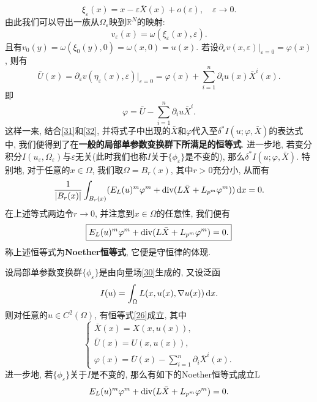 \begin{equation*}
    \xi_{\varepsilon}(x) = x - \varepsilon\bar{X}(x) + o(\varepsilon), \quad \varepsilon \rightarrow 0.
\end{equation*} 
由此我们可以导出一族从$\Omega_{\varepsilon}$映到$\mathbb{R}^N$的映射:
\begin{equation*}
    v_{\varepsilon}(x) = \omega(\xi_{\varepsilon}(x), \varepsilon). 
\end{equation*}
且有$v_0(y) = \omega(\xi_0(y), 0) = \omega(x, 0) = u(x)$. 若设$\partial_{\varepsilon}v(x, \varepsilon)|_{\varepsilon = 0} = \varphi(x)$, 则有  
\begin{equation*}
    \bar{U}(x) = \partial_{\varepsilon}v(\eta_{\varepsilon}(x), \varepsilon)|_{\varepsilon = 0} = \varphi(x) + \sum_{i = 1}^n\partial_iu(x)\bar{X}^i(x).
\end{equation*}
即 
\begin{equation}\label{32}
    \varphi = \bar{U} - \sum_{i = 1}^n\partial_iu\bar{X}^i. 
\end{equation}
这样一来, 结合\eqref{31}和\eqref{32}, 并将式子中出现的$\bar{X}$和$\varphi$代入至$\delta^*I(u; \varphi, \bar{X})$的表达式中, 我们便得到了在\textbf{一般的局部单参数变换群下所满足的恒等式}.
进一步地, 若变分积分$I(u_{\varepsilon}, \Omega_{\varepsilon})$与$\varepsilon$无关(此时我们也称$I$关于$\{\phi_{\varepsilon}\}$是不变的), 那么$\delta^*I(u; \varphi, \bar{X})$.
特别地, 对于任意的$x \in \Omega$,  我们取$\Omega = B_r(x)$, 其中$r > 0$充分小, 从而有
\begin{equation*}
    \frac{1}{|B_r(x)|}\int_{B_r(x)}(E_L(u)^m\varphi^m + {\rm div}(L\bar{X} + L_{p^m}\varphi^m)) \,{\rm d}x = 0.
\end{equation*}
在上述等式两边令$r \rightarrow 0$, 并注意到$x \in \Omega$的任意性, 我们便有
\begin{equation*}
    \boxed{E_L(u)^m\varphi^m + {\rm div}(L\bar{X} + L_{p^m}\varphi^m) = 0.}
\end{equation*}
称上述恒等式为\textbf{Noether恒等式}, 它便是守恒律的体现.

\begin{theorem}[Noether定理]
    设局部单参数变换群$\{\phi_{\varepsilon}\}$是由向量场\eqref{30}生成的, 又设泛函
    \begin{equation*}
        I(u) = \int_{\Omega}L(x, u(x), \nabla u(x)) \,{\rm d}x.
    \end{equation*}
    则对任意的$u \in C^2(\Omega)$, 有恒等式\eqref{26}成立, 其中
    \begin{equation*}
        \begin{cases} 
            \bar{X}(x) = X(x, u(x)), \\  
            \bar{U}(x) = U(x, u(x)), \\  
            \displaystyle \varphi(x) = \bar{U}(x)  - \sum_{i = 1}^n\partial_i\bar{X}^i(x).  
        \end{cases}
    \end{equation*}
    进一步地, 若$\{\phi_{\varepsilon}\}$关于$I$是不变的, 那么有如下的Noether恒等式成立L
    \begin{equation*}
        E_L(u)^m\varphi^m + {\rm div}(L\bar{X} + L_{p^m}\varphi^m) = 0.
    \end{equation*}
\end{theorem}

